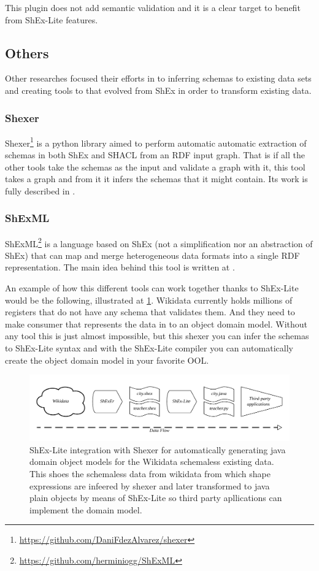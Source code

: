 This plugin does not add semantic validation and it is a clear target to benefit from ShEx-Lite features.

\subsection{Others}
Other researches focused their efforts in to inferring schemas to existing data sets and creating tools to that
evolved from ShEx in order to transform existing data.

\subsubsection{Shexer}
Shexer\footnote{\url{https://github.com/DaniFdezAlvarez/shexer}} is a python library aimed to perform automatic
automatic extraction of schemas in both ShEx and SHACL from an RDF input graph. That is if all the other tools
take the schemas as the input and validate a graph with it, this tool takes a graph and from it it infers the
schemas that it might contain. Its work is fully described in \cite{iovka-auto-shex-shacl, fernandez2016inference}.

\subsubsection{ShExML}
ShExML\footnote{\url{https://github.com/herminiogg/ShExML}} is a language based on ShEx (not a simplification nor
an abstraction of ShEx) that can map and merge heterogeneous data formats into a single RDF representation.
The main idea behind this tool is written at \cite{shexml}.

\bigskip

An example of how this different tools can work together thanks to ShEx-Lite would be the following, illustrated
at \cref{fig:shex-lite-shexer-integration}.
Wikidata currently holds millions of registers that do not have any schema that validates them. And they need to
make consumer that represents the data in to an object domain model. Without any tool this is just almost impossible,
but this shexer you can infer the schemas to ShEx-Lite syntax and with the ShEx-Lite compiler you can automatically
create the object domain model in your favorite OOL.

\begin{figure}
    \includegraphics[width=\textwidth]{images/shex-lite-shexer-integration.png}
    \centering
    \caption[ShEx-Lite integration with Shexer]{ShEx-Lite integration with Shexer for automatically generating
    java domain object models for the Wikidata schemaless existing data. This shoes the schemaless data from
    wikidata from which shape expressions are infeered by shexer and later transformed to java plain objects by
    means of ShEx-Lite so third party apllications can implement the domain model.}
	\label{fig:shex-lite-shexer-integration}
\end{figure}